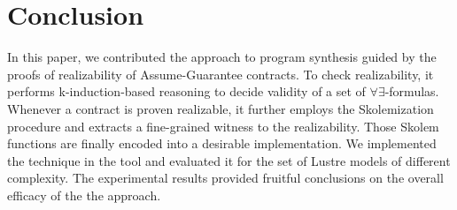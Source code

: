 \section{Conclusion}
\label{sec:conclusion}
In this paper, we contributed the approach to program synthesis guided by the proofs of realizability of Assume-Guarantee contracts.
To check realizability, it performs k-induction-based reasoning to decide validity of a set of $\forall\exists$-formulas.
Whenever a contract is proven realizable, it further employs the Skolemization procedure and extracts a fine-grained witness to the realizability.
Those Skolem functions are finally encoded into a desirable implementation.
We implemented the technique in the \toolname{} tool and evaluated it for the set of Lustre models of different complexity.
The experimental results provided fruitful conclusions on the overall efficacy of the the approach.
